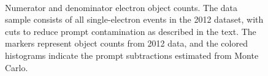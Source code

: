 \begin{figure}
{	
	\label{f:denlinscale}
  } \\
  \caption{Numerator and denominator electron object counts. The data sample consists of all single-electron events in the 2012 dataset, with cuts to reduce prompt contamination as described in the text. The markers represent object counts from 2012 data, and the colored histograms indicate the prompt subtractions estimated from Monte Carlo.}
  \label{fig:el-ff-data-prompt-subtractions}
\end{figure}

